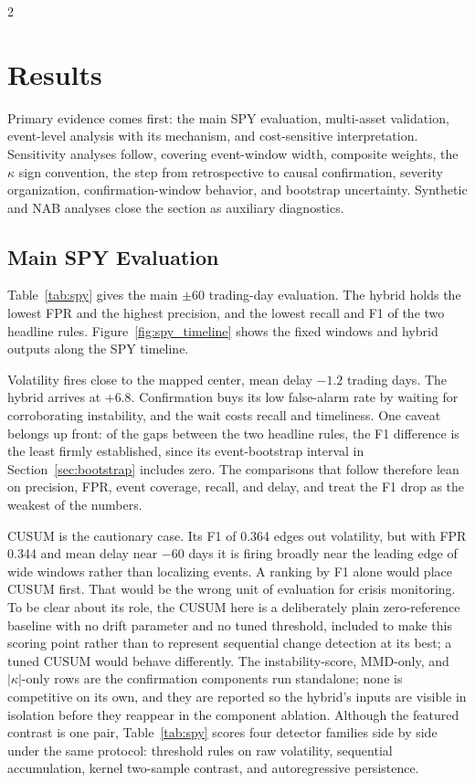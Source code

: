 \documentclass{book}
\begin{document}
\begin{multicols}{2}
\section{Results}
Primary evidence comes first: the main SPY evaluation, multi-asset validation, event-level analysis with its mechanism, and cost-sensitive interpretation. Sensitivity analyses follow, covering event-window width, composite weights, the $\kappa$ sign convention, the step from retrospective to causal confirmation, severity organization, confirmation-window behavior, and bootstrap uncertainty. Synthetic and NAB analyses close the section as auxiliary diagnostics.

\subsection{Main SPY Evaluation}
Table~\ref{tab:spy} gives the main $\pm60$ trading-day evaluation. The hybrid holds the lowest FPR and the highest precision, and the lowest recall and F1 of the two headline rules. Figure~\ref{fig:spy_timeline} shows the fixed windows and hybrid outputs along the SPY timeline.

Volatility fires close to the mapped center, mean delay $-1.2$ trading days. The hybrid arrives at $+6.8$. Confirmation buys its low false-alarm rate by waiting for corroborating instability, and the wait costs recall and timeliness. One caveat belongs up front: of the gaps between the two headline rules, the F1 difference is the least firmly established, since its event-bootstrap interval in Section~\ref{sec:bootstrap} includes zero. The comparisons that follow therefore lean on precision, FPR, event coverage, recall, and delay, and treat the F1 drop as the weakest of the numbers.

CUSUM is the cautionary case. Its F1 of 0.364 edges out volatility, but with FPR 0.344 and mean delay near $-60$ days it is firing broadly near the leading edge of wide windows rather than localizing events. A ranking by F1 alone would place CUSUM first. That would be the wrong unit of evaluation for crisis monitoring. To be clear about its role, the CUSUM here is a deliberately plain zero-reference baseline with no drift parameter and no tuned threshold, included to make this scoring point rather than to represent sequential change detection at its best; a tuned CUSUM would behave differently. The instability-score, MMD-only, and $|\kappa|$-only rows are the confirmation components run standalone; none is competitive on its own, and they are reported so the hybrid's inputs are visible in isolation before they reappear in the component ablation. Although the featured contrast is one pair, Table~\ref{tab:spy} scores four detector families side by side under the same protocol: threshold rules on raw volatility, sequential accumulation, kernel two-sample contrast, and autoregressive persistence.


\end{multicols}
\end{document}
